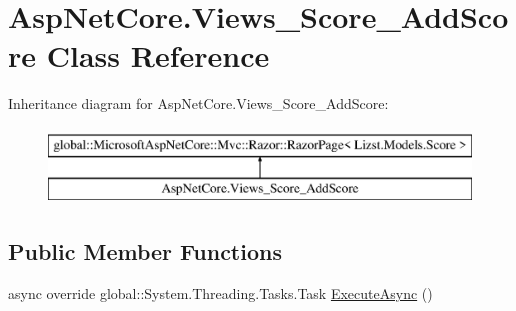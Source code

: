 \hypertarget{class_asp_net_core_1_1_views___score___add_score}{}\section{Asp\+Net\+Core.\+Views\+\_\+\+Score\+\_\+\+Add\+Score Class Reference}
\label{class_asp_net_core_1_1_views___score___add_score}
Inheritance diagram for Asp\+Net\+Core.\+Views\+\_\+\+Score\+\_\+\+Add\+Score\+:\begin{figure}[H]
\begin{center}
\leavevmode
\includegraphics[height=2.000000cm]{class_asp_net_core_1_1_views___score___add_score}
\end{center}
\end{figure}
\subsection*{Public Member Functions}
\begin{DoxyCompactItemize}
\item 
async override global\+::\+System.\+Threading.\+Tasks.\+Task \mbox{\hyperlink{class_asp_net_core_1_1_views___score___add_score_a8a8565e7398c0345c154bb06f8df868b}{Execute\+Async}} ()
\end{DoxyCompactItemize}
